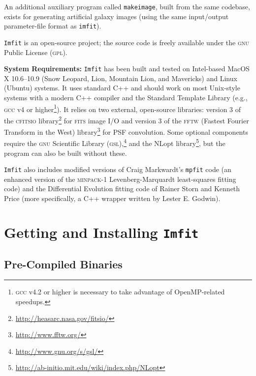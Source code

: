 \documentclass[10pt,a4paper,article]{memoir}
\newcommand{\imfit}{\texttt{imfit}}
\newcommand{\Imfit}{\texttt{Imfit}}
\newcommand{\makeimage}{\texttt{makeimage}}
\begin{document}

An additional auxiliary program called \makeimage{}, built from the same
codebase, exists for generating artificial galaxy images (using the same
input/output parameter-file format as \imfit{}).

\Imfit{} is an open-source project; the source code is freely available
under the \textsc{gnu} Public License (\textsc{gpl}).


\bigskip

\textbf{System Requirements:} \Imfit{} has been built and tested on
Intel-based MacOS X 10.6--10.9 (Snow Leopard, Lion, Mountain Lion, and
Mavericks)
and Linux (Ubuntu) systems. It uses standard C++ and should work on most
Unix-style systems with a modern C++ compiler and the Standard Template
Library (e.g., \textsc{gcc} v4 or higher\footnote{\textsc{gcc} v4.2 or
higher is necessary to take advantage of OpenMP-related speedups.}). It
relies on two external, open-source libraries: version 3 of the
\textsc{cfitsio} library\footnote{\url{http://heasarc.nasa.gov/fitsio/}}
for \textsc{fits} image I/O and version 3 of the \textsc{fftw} (Fastest
Fourier Transform in the West)
library\footnote{\url{http://www.fftw.org/}} for PSF convolution. Some
optional components require the \textsc{gnu} Scientific Library
(\textsc{gsl}),\footnote{\url{http://www.gnu.org/s/gsl/}} and the NLopt
library\footnote{\url{http://ab-initio.mit.edu/wiki/index.php/NLopt}},
but the program can also be built without these.

\bigskip

\Imfit{} also includes modified versions of Craig Markwardt's
\texttt{mpfit} code (an enhanced version of the \textsc{minpack-1}
Levenberg-Marquardt least-squares fitting code) and the Differential
Evolution fitting code of Rainer Storn and Kenneth Price (more
specifically, a C++ wrapper written by Lester E. Godwin).



\chapter{Getting and Installing \Imfit{}}

\section{Pre-Compiled Binaries}
\end{document}
